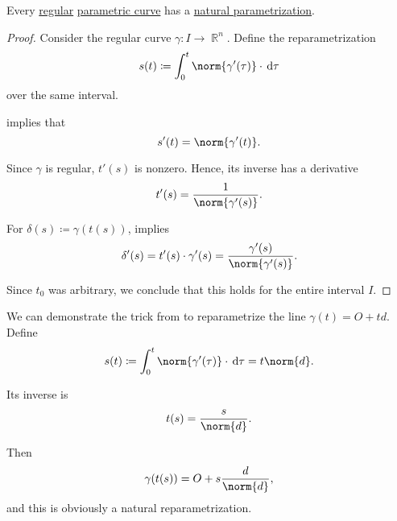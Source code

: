 \begin{proposition}\label{thm:natural_reparametrization}
  Every \hyperref[def:smooth_curve/regular]{regular} \hyperref[def:parametric_curve]{parametric curve} has a \hyperref[def:smooth_curve/natural_parameter]{natural parametrization}.
\end{proposition}
\begin{proof}
  Consider the regular curve \( \gamma: I \to \BbbR^n \). Define the reparametrization
  \begin{equation*}
    s(t) \coloneqq \int_0^t \norm{\gamma'(\tau)} \cdot \dl \tau
  \end{equation*}
  over the same interval.

   implies that
  \begin{equation*}
    s'(t) = \norm{\gamma'(t)}.
  \end{equation*}

  Since \( \gamma \) is regular, \( t'(s) \) is nonzero. Hence, its inverse has a derivative
  \begin{equation*}
    t'(s) = \frac 1 {\norm{\gamma'(s)}}.
  \end{equation*}

  For \( \delta(s) \coloneqq \gamma(t(s)) \),  implies
  \begin{equation*}
    \delta'(s)
    =
    t'(s) \cdot \gamma'(s)
    =
    \frac {\gamma'(s)} {\norm{\gamma'(s)}}.
  \end{equation*}

  Since \( t_0 \) was arbitrary, we conclude that this holds for the entire interval \( I \).
\end{proof}

\begin{example}\label{ex:natural_reparametrization_of_line}
  We can demonstrate the trick from  to reparametrize the line \( \gamma(t) = O + td \). Define
  \begin{equation*}
    s(t) \coloneqq \int_0^t \norm{\gamma'(\tau)} \cdot \dl \tau = t \norm{d}.
  \end{equation*}

  Its inverse is
  \begin{equation*}
    t(s) = \frac s {\norm{d}}.
  \end{equation*}

  Then
  \begin{equation*}
    \gamma(t(s)) = O + s \frac d {\norm{d}},
  \end{equation*}
  and this is obviously a natural reparametrization.
\end{example}

